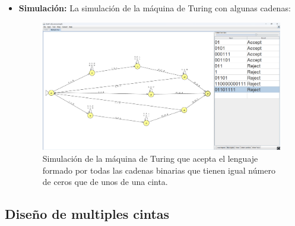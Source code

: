 \documentclass[11pt]{report}
\begin{document}
\begin{itemize}
  \item \textbf{Simulación:} La simulación de la máquina de Turing con algunas cadenas:
        \begin{figure}[H]
          \centering
          \includegraphics[scale=0.33]{img/MT_05_one_ribbon_simulation.png}
          \caption{Simulación de la máquina de Turing que acepta el lenguaje formado por todas las cadenas binarias que tienen igual número de ceros que de unos de una cinta.}
          \label{fig:simulacion de la maquina de turing que acepta el lenguaje formado por todas las cadenas binarias que tienen igual número de ceros que de unos de una cinta}
        \end{figure}
\end{itemize}

\newpage

\subsection{Diseño de multiples cintas}
\end{document}
